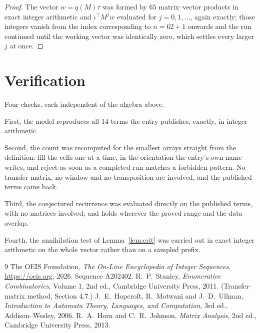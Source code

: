 \documentclass[11pt,a4paper]{article}
\theoremstyle{plain}
\theoremstyle{definition}
\begin{document}
\begin{proof}
The vector $w=q(M)\tau$ was formed by $65$ matrix--vector products in exact integer
arithmetic and $\iota^{\!\top}M^{j}w$ evaluated for $j=0,1,\dots$, again exactly; those
integers vanish from the index corresponding to $n=62+1$ onwards and the run continued
until the working vector was identically zero, which settles every larger $j$ at once.
\end{proof}

\section{Verification}

Four checks, each independent of the algebra above.

First, the model reproduces all $14$ terms the entry publishes, exactly, in integer
arithmetic.

Second, the count was recomputed for the smallest arrays straight from the definition: fill the
cells one at a time, in the orientation the entry's own name writes, and reject as soon as a
completed run matches a forbidden pattern. No transfer matrix, no window and no transposition
are involved, and the published terms came back.

Third, the conjectured recurrence was evaluated directly on the published terms, with no
matrices involved, and holds wherever the proved range and the data overlap.

Fourth, the annihilation test of Lemma~\ref{lem:crit} was carried out in exact integer
arithmetic on the whole vector rather than on a sampled prefix.

\begin{thebibliography}{9}
 The OEIS Foundation, \emph{The On-Line Encyclopedia of Integer
Sequences}, \url{https://oeis.org}, 2026. Sequence A202402.
 R.~P.~Stanley, \emph{Enumerative Combinatorics}, Volume 1, 2nd ed.,
Cambridge University Press, 2011. (Transfer-matrix method, Section 4.7.)
 J.~E.~Hopcroft, R.~Motwani and J.~D.~Ullman, \emph{Introduction to Automata
Theory, Languages, and Computation}, 3rd ed., Addison--Wesley, 2006.
 R.~A.~Horn and C.~R.~Johnson, \emph{Matrix Analysis}, 2nd ed., Cambridge
University Press, 2013.
\end{thebibliography}
\end{document}
